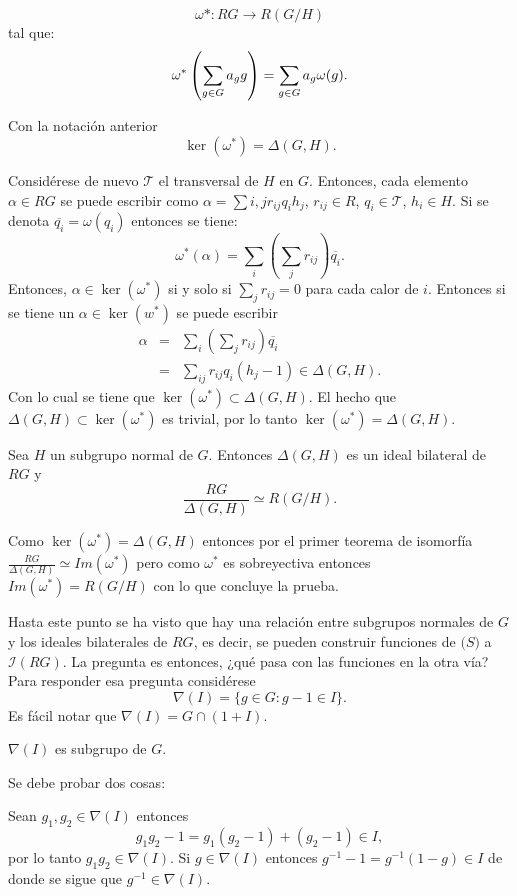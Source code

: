 \[\omega* : RG \to R(G/H)\]
tal que:
\[\omega^*\left(\sum_{g \in G} a_{g} g \right) = \sum_{g \in G} a_g\omega(g).\]
\begin{proposicion}
Con la notación anterior
\[\ker(\omega^*) =\Delta(G,H).\]
\end{proposicion}
\begin{proof*}
Considérese de nuevo $\mathcal{T}$ el transversal de $H$ en $G$. Entonces, cada elemento $\alpha \in RG$ se puede escribir como $ \alpha = \sum{i,j} r_{ij} q_ih_j$, $r_{ij} \in R$, $q_i \in \mathcal{T}$, $h_i \in H$. Si se denota $\overline{q_i} = \omega(q_i)$ entonces se tiene:
\[\omega^*(\alpha) = \sum_i\left(\sum_jr_{ij}\right)\overline{q_i}. \]
\indent Entonces, $\alpha \in \ker(\omega^*)$ si y solo si $ \sum_jr_{ij} = 0 $ para cada calor de $i$. Entonces si se tiene un $\alpha \in \ker(w^*)$ se puede escribir
\begin{eqnarray*}
\alpha &=& \sum_i\left(\sum_jr_{ij}\right)\overline{q_i} \\
 &=& \sum_{ij}r_{ij}q_i(h_j-1) \in \Delta(G,H).  
\end{eqnarray*}
\indent Con lo cual se tiene que $\ker(\omega^*) \subset \Delta(G,H)$. El hecho que $\Delta(G,H) \subset \ker(\omega^*)$ es trivial, por lo tanto $\ker(\omega^*) = \Delta(G,H)$.
\end{proof*}
\begin{corolario}
Sea $H$ un subgrupo normal de $G$. Entonces $\Delta(G,H)$ es un ideal bilateral de $RG$ y
\[\frac{RG}{\Delta(G,H)} \simeq R(G/H).\]
\end{corolario}
\begin{proof*}
Como $\ker(\omega^*) = \Delta(G,H)$ entonces por el primer teorema de isomorfía $ \frac{RG}{\Delta(G,H)} \simeq Im(\omega^*) $ pero como $\omega^*$ es sobreyectiva entonces $Im(\omega^*) = R(G/H)$ con lo que concluye la prueba. 
\end{proof*}
Hasta este punto se ha visto que hay una relación entre subgrupos normales de $G$ y los ideales bilaterales de $RG$, es decir, se pueden construir funciones de $\mathcal(S) $ a $\mathcal{I}(RG)$. La pregunta es entonces, ¿qué pasa con las funciones en la otra vía? Para responder esa pregunta considérese 
\[\nabla(I) = \{ g \in G \colon  g-1 \in I\}.\]
Es fácil notar que $\nabla(I) = G \cap (1+I)$.
\begin{lema}
$\nabla(I)$ es subgrupo de $G$.
\end{lema}
\begin{proof*}
Se debe probar dos cosas:
\begin{finalList}
\newItem Sean $g_1,g_2 \in \nabla(I)$ entonces 
\[g_1g_2 -1 = g_1(g_2-1) + (g_2-1) \in I, \]
por lo tanto $g_1g_2 \in \nabla(I)$.
\newItem Si $g \in \nabla(I)$ entonces $g^{-1} -1 = g^{-1}(1-g) \in I$ de donde se sigue que $g^{-1} \in \nabla(I)$.\qedhere 
\end{finalList}
\end{proof*}

